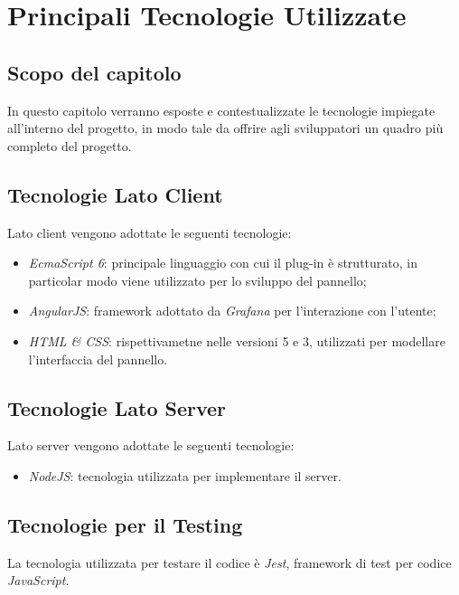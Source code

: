 \section{Principali Tecnologie Utilizzate}\label{tecnologie}
\subsection{Scopo del capitolo}
In questo capitolo verranno esposte e contestualizzate le tecnologie impiegate all'interno del progetto, in modo tale da offrire agli sviluppatori un quadro più completo del progetto.

\subsection{Tecnologie Lato Client}\label{clientTec}
Lato client vengono adottate le seguenti tecnologie:
\begin{itemize}
	\item \textit{EcmaScript 6}: principale linguaggio con cui il plug-in è strutturato, in particolar modo viene utilizzato per lo sviluppo del pannello;
	\item \textit{AngularJS}: framework adottato da \textit{Grafana} per l'interazione con l'utente;
	\item \textit{HTML \& CSS}: rispettivametne nelle versioni 5 e 3, utilizzati per modellare l'interfaccia del pannello.
\end{itemize}

\subsection{Tecnologie Lato Server}\label{serverTec}
Lato server vengono adottate le seguenti tecnologie:
\begin{itemize}
	\item \textit{NodeJS}: tecnologia utilizzata per implementare il server.
\end{itemize}

\subsection{Tecnologie per il Testing}\label{testTec}
La tecnologia utilizzata per testare il codice è \textit{Jest}, framework di test per codice \textit{JavaScript}.